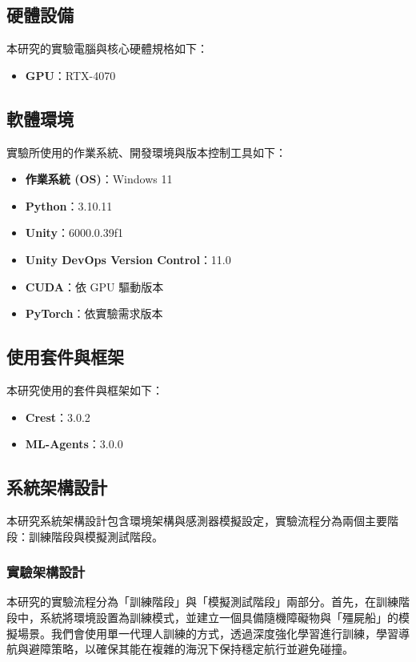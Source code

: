 \documentclass[12pt,a4paper]{ctexart}
\begin{document}
\subsection{硬體設備}
本研究的實驗電腦與核心硬體規格如下：
\begin{itemize}
    \item \textbf{GPU}：RTX-4070
\end{itemize}

\subsection{軟體環境}
實驗所使用的作業系統、開發環境與版本控制工具如下：
\begin{itemize}
    \item \textbf{作業系統 (OS)}：Windows 11
    \item \textbf{Python}：3.10.11
    \item \textbf{Unity}：6000.0.39f1
    \item \textbf{Unity DevOps Version Control}：11.0
    \item \textbf{CUDA}：依 GPU 驅動版本
    \item \textbf{PyTorch}：依實驗需求版本
\end{itemize}

\subsection{使用套件與框架}
本研究使用的套件與框架如下：
\begin{itemize}
    \item \textbf{Crest}：3.0.2
    \item \textbf{ML-Agents}：3.0.0
\end{itemize}

\subsection{系統架構設計}
本研究系統架構設計包含環境架構與感測器模擬設定，實驗流程分為兩個主要階段：訓練階段與模擬測試階段。

\subsubsection{實驗架構設計}
本研究的實驗流程分為「訓練階段」與「模擬測試階段」兩部分。首先，在訓練階段中，系統將環境設置為訓練模式，並建立一個具備隨機障礙物與「殭屍船」的模擬場景。我們會使用單一代理人訓練的方式，透過深度強化學習進行訓練，學習導航與避障策略，以確保其能在複雜的海況下保持穩定航行並避免碰撞。
\end{document}
